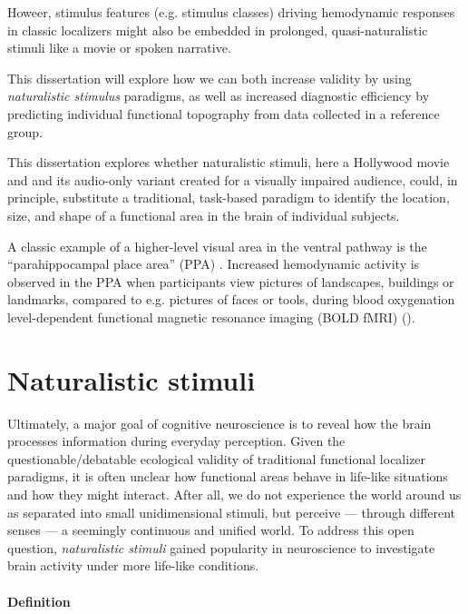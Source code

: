 %
Howeer, stimulus features (e.g. stimulus classes) driving hemodynamic responses
in classic localizers might also be embedded in prolonged, quasi-naturalistic
stimuli like a movie or spoken narrative.

%
This dissertation will explore how we can both increase validity by using
\textit{naturalistic stimulus} paradigms, as well as increased diagnostic
efficiency by predicting individual functional topography from data collected in
a reference group.

This dissertation explores whether naturalistic stimuli, here a Hollywood movie
and and its audio-only variant created for a visually impaired audience, could,
in principle, substitute a traditional, task-based paradigm to identify the
location, size, and shape of a functional area in the brain of individual
subjects.

A classic example of a higher-level visual area in the ventral pathway is the
``parahippocampal place area'' (PPA) \citep{epstein1998ppa,
epstein1999parahippocampal}.
%
Increased hemodynamic activity is observed in the PPA when participants view
pictures of landscapes, buildings or landmarks, compared to e.g. pictures of
faces or tools, during blood oxygenation level-dependent functional magnetic
resonance imaging (BOLD fMRI) (\citep[see reviews][]{epstein2014neural,
aminoff2013role}).


\section{Naturalistic stimuli}

Ultimately, a major goal of cognitive neuroscience is to reveal how the brain
processes information during everyday perception.
%
Given the questionable/debatable ecological validity of traditional functional
localizer paradigms, it is often unclear how functional areas behave in
life-like situations and how they might interact.
%
After all, we do not experience the world around us as separated into small
unidimensional stimuli, but perceive --- through different senses --- a
seemingly continuous and unified world.
%
To address this open question, \textit{naturalistic stimuli} gained popularity
in neuroscience to investigate brain activity under more life-like conditions.


\paragraph{Definition}

